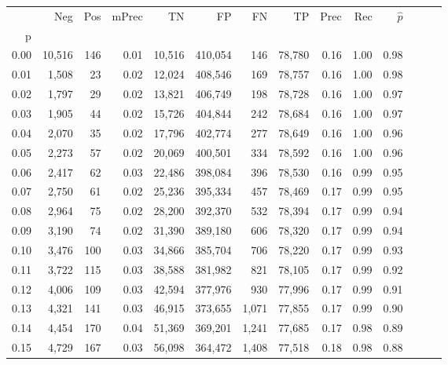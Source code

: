 \begin{tabular}{rrrrrrrrrrrrrr}
\toprule
{} &     Neg &    Pos & mPrec &       TN &       FP &      FN &      TP &  Prec &   Rec & $\hat{p}$ \\
p    &         &        &       &          &          &         &         &       &       &           \\
\midrule
0.00 &  10,516 &    146 &  0.01 &   10,516 &  410,054 &     146 &  78,780 &  0.16 &  1.00 &      0.98 \\
0.01 &   1,508 &     23 &  0.02 &   12,024 &  408,546 &     169 &  78,757 &  0.16 &  1.00 &      0.98 \\
0.02 &   1,797 &     29 &  0.02 &   13,821 &  406,749 &     198 &  78,728 &  0.16 &  1.00 &      0.97 \\
0.03 &   1,905 &     44 &  0.02 &   15,726 &  404,844 &     242 &  78,684 &  0.16 &  1.00 &      0.97 \\
0.04 &   2,070 &     35 &  0.02 &   17,796 &  402,774 &     277 &  78,649 &  0.16 &  1.00 &      0.96 \\
0.05 &   2,273 &     57 &  0.02 &   20,069 &  400,501 &     334 &  78,592 &  0.16 &  1.00 &      0.96 \\
0.06 &   2,417 &     62 &  0.03 &   22,486 &  398,084 &     396 &  78,530 &  0.16 &  0.99 &      0.95 \\
0.07 &   2,750 &     61 &  0.02 &   25,236 &  395,334 &     457 &  78,469 &  0.17 &  0.99 &      0.95 \\
0.08 &   2,964 &     75 &  0.02 &   28,200 &  392,370 &     532 &  78,394 &  0.17 &  0.99 &      0.94 \\
0.09 &   3,190 &     74 &  0.02 &   31,390 &  389,180 &     606 &  78,320 &  0.17 &  0.99 &      0.94 \\
0.10 &   3,476 &    100 &  0.03 &   34,866 &  385,704 &     706 &  78,220 &  0.17 &  0.99 &      0.93 \\
0.11 &   3,722 &    115 &  0.03 &   38,588 &  381,982 &     821 &  78,105 &  0.17 &  0.99 &      0.92 \\
0.12 &   4,006 &    109 &  0.03 &   42,594 &  377,976 &     930 &  77,996 &  0.17 &  0.99 &      0.91 \\
0.13 &   4,321 &    141 &  0.03 &   46,915 &  373,655 &   1,071 &  77,855 &  0.17 &  0.99 &      0.90 \\
0.14 &   4,454 &    170 &  0.04 &   51,369 &  369,201 &   1,241 &  77,685 &  0.17 &  0.98 &      0.89 \\
0.15 &   4,729 &    167 &  0.03 &   56,098 &  364,472 &   1,408 &  77,518 &  0.18 &  0.98 &      0.88 \\

\end{tabular}
